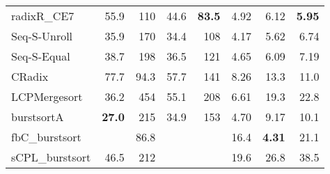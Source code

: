 \documentclass[a4paper]{myjournal}
\begin{document}
\begin{table}[p]
\begin{tabular}{l|rrrr rrr|}
     radixR\_CE7 &     55.9 &      110 &     44.6 & \bf 83.5 &     4.92 &     6.12 & \bf 5.95 \\
Seq-S-Unroll &     35.9 &      170 &     34.4 &      108 &     4.17 &     5.62 &     6.74 \\
 Seq-S-Equal &     38.7 &      198 &     36.5 &      121 &     4.65 &     6.09 &     7.19 \\
          CRadix &     77.7 &     94.3 &     57.7 &      141 &     8.26 &     13.3 &     11.0 \\
    LCPMergesort &     36.2 &      454 &     55.1 &      208 &     6.61 &     19.3 &     22.8 \\
      burstsortA & \bf 27.0 &      215 &     34.9 &      153 &     4.70 &     9.17 &     10.1 \\
  fbC\_burstsort &          &     86.8 &          &          &     16.4 & \bf 4.31 &     21.1 \\
 sCPL\_burstsort &     46.5 &      212 &          &          &     19.6 &     26.8 &     38.5 \\ \hline
\end{tabular}
\end{table}
 


\def\SpeedupLegend{\legend{
    pS-Unroll,
    pS-Equal,
    pS-Unroll + pLCP-Merge,
    pMultikeyQuicksort,
    pRadixsort 8-bit,
    pRadixsort 16-bit,
    pRadixsort Akiba
  }}
\end{document}
